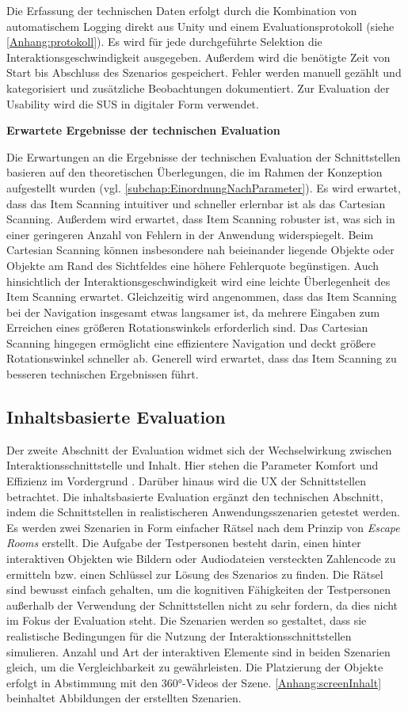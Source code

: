 Die Erfassung der technischen Daten erfolgt durch die Kombination von automatischem Logging direkt aus Unity und einem Evaluationsprotokoll (siehe \autoref{Anhang:protokoll}). Es wird für jede durchgeführte Selektion die Interaktionsgeschwindigkeit ausgegeben. Außerdem wird die benötigte Zeit von Start bis Abschluss des Szenarios gespeichert. Fehler werden manuell gezählt und kategorisiert und zusätzliche Beobachtungen dokumentiert. Zur Evaluation der Usability wird die SUS in digitaler Form verwendet.

\textbf{Erwartete Ergebnisse der technischen Evaluation}

Die Erwartungen an die Ergebnisse der technischen Evaluation der Schnittstellen basieren auf den theoretischen Überlegungen, die im Rahmen der Konzeption aufgestellt wurden (vgl. \autoref{subchap:EinordnungNachParameter}). Es wird erwartet, dass das Item Scanning intuitiver und schneller erlernbar ist als das Cartesian Scanning. Außerdem wird erwartet, dass Item Scanning robuster ist, was sich in einer geringeren Anzahl von Fehlern in der Anwendung widerspiegelt. Beim Cartesian Scanning können insbesondere nah beieinander liegende Objekte oder Objekte am Rand des Sichtfeldes eine höhere Fehlerquote begünstigen. Auch hinsichtlich der Interaktionsgeschwindigkeit wird eine leichte Überlegenheit des Item Scanning erwartet.
Gleichzeitig wird angenommen, dass das Item Scanning bei der Navigation insgesamt etwas langsamer ist, da mehrere Eingaben zum Erreichen eines größeren Rotationswinkels erforderlich sind. Das Cartesian Scanning hingegen ermöglicht eine effizientere Navigation und deckt größere Rotationswinkel schneller ab. Generell wird erwartet, dass das Item Scanning zu besseren technischen Ergebnissen führt.

\subsection{Inhaltsbasierte Evaluation}

Der zweite Abschnitt der Evaluation widmet sich der Wechselwirkung zwischen Interaktionsschnittstelle und Inhalt. Hier stehen die Parameter Komfort und Effizienz im Vordergrund . Darüber hinaus wird die UX der Schnittstellen betrachtet. Die inhaltsbasierte Evaluation ergänzt den technischen Abschnitt, indem die Schnittstellen in realistischeren Anwendungsszenarien getestet werden.
Es werden zwei Szenarien in Form einfacher Rätsel nach dem Prinzip von \textit{Escape Rooms} erstellt. Die Aufgabe der Testpersonen besteht darin, einen hinter interaktiven Objekten wie Bildern oder Audiodateien versteckten Zahlencode zu ermitteln bzw. einen Schlüssel zur Lösung des Szenarios zu finden. Die Rätsel sind bewusst einfach gehalten, um die kognitiven Fähigkeiten der Testpersonen außerhalb der Verwendung der Schnittstellen nicht zu sehr fordern, da dies nicht im Fokus der Evaluation steht. Die Szenarien werden so gestaltet, dass sie realistische Bedingungen für die Nutzung der Interaktionsschnittstellen simulieren. Anzahl und Art der interaktiven Elemente sind in beiden Szenarien gleich, um die Vergleichbarkeit zu gewährleisten. Die Platzierung der Objekte erfolgt in Abstimmung mit den 360°-Videos der Szene. \autoref{Anhang:screenInhalt} beinhaltet Abbildungen der erstellten Szenarien. 

